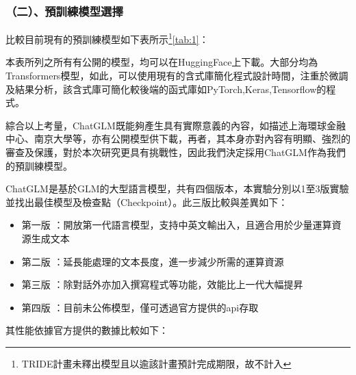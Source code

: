 \documentclass[12pt,a4paper,MingLiU,UTF8,natbib]{article}
\def\xeCJKembold{0.4}
\def\saveCJKnode{\dimen255\lastkern}
\def\restoreCJKnode{\kern-\dimen255\kern\dimen255}
\let\CJKoldsymbol\CJKsymbol
\let\CJKoldpunctsymbol\CJKpunctsymbol
\def\CJKfakeboldsymbol#1{%
	\special{pdf:literal direct 2 Tr \xeCJKembold\space w}%
	\CJKoldsymbol{#1}%
	\saveCJKnode
	\special{pdf:literal direct 0 Tr}%
	\restoreCJKnode}
\def\CJKfakeboldpunctsymbol#1{%
	\special{pdf:literal direct 2 Tr \xeCJKembold\space w}%
	\CJKoldpunctsymbol{#1}%
	\saveCJKnode
	\special{pdf:literal direct 0 Tr}%
	\restoreCJKnode}
\newcommand\CJKfakebold[1]{%
	\let\CJKsymbol\CJKfakeboldsymbol
	\let\CJKpunctsymbol\CJKfakeboldpunctsymbol
	#1%
	\let\CJKsymbol\CJKoldsymbol
	\let\CJKpunctsymbol\CJKoldpunctsymbol}
\begin{document}
	\subsubsection{（二）、預訓練模型選擇}
	比較目前現有的預訓練模型如下表所示\footnote{TRIDE計畫未釋出模型且以逾該計畫預計完成期限，故不計入}\ref{tab:1}：
	\begin{table}[H]
		\caption{比較及評估預訓練模型}%
		\label{tab:1}
	\end{table}
	本表所列之所有有公開的模型，均可以在HuggingFace上下載。大部分均為Transformers模型，如此，可以使用現有的含式庫簡化程式設計時間，注重於微調及結果分析，該含式庫可簡化較後端的函式庫如PyTorch,Keras,Tensorflow的程式。%

	綜合以上考量，ChatGLM既能夠產生具有實際意義的內容，如描述上海環球金融中心、南京大學等，亦有公開模型供下載，再者，其本身亦對內容有明顯、強烈的審查及保護，對於本次研究更具有挑戰性，因此我們決定採用ChatGLM作為我們的預訓練模型。


	ChatGLM是基於GLM的大型語言模型，共有四個版本，本實驗分別以1至3版實驗並找出最佳模型及檢查點（Checkpoint）。此三版比較與差異如下：
	\begin{itemize}
		\item \CJKfakebold{第一版}：開放第一代語言模型，支持中英文輸出入，且適合用於少量運算資源生成文本
		\item \CJKfakebold{第二版}：延長能處理的文本長度，進一步減少所需的運算資源
		\item \CJKfakebold{第三版}：除對話外亦加入撰寫程式等功能，效能比上一代大幅提昇
		\item \CJKfakebold{第四版}：目前未公佈模型，僅可透過官方提供的api存取
	\end{itemize}
	其性能依據官方提供的數據比較如下：
	
\end{document}
